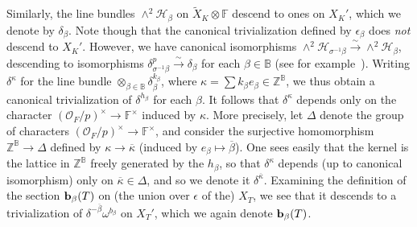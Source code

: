 \documentclass[11pt,pdflatex]{amsart}
\theoremstyle{plain}
\theoremstyle{definition}
\newcommand{\lra}{\longrightarrow}
\newcommand{\FF}{\mathbf{F}}
\newcommand{\ZZ}{\mathbf{Z}}
\newcommand{\CO}{\mathcal{O}}
\theoremstyle{plain}
\theoremstyle{definition}
\theoremstyle{remark}
\numberwithin{equation}{section}
\numberwithin{figure}{section} \numberwithin{table}{subsection}
\def\BB{\mathbb{B}}
\def\FF{\mathbb{F}}
\def\ZZ{\mathbb{Z}}
\begin{document}
Similarly, the line bundles $\wedge^2{\mathcal H}_\beta$ on $\widetilde{X}_K \otimes \FF$ descend to ones on $X_K'$, which we denote by $\delta_\beta$.  Note though that the canonical trivialization defined by $\epsilon_\beta$ does {\em not} descend to $X_K'$. However, we have canonical isomorphisms $\wedge^2{\mathcal H}_{\sigma^{-1}\beta} \stackrel{\sim}{\to} \wedge^2{\mathcal H}_\beta$, descending to isomorphisms $\delta_{\sigma^{-1}\beta}^p \stackrel{\sim}{\lra} \delta_\beta$ for each $\beta \in \BB$ (see for example~\cite[\S3.2.2]{DKS}).  Writing $\delta^\kappa$ for the line bundle $\otimes_{\beta\in\BB}\delta_\beta^{k_\beta}$, where $\kappa = \sum k_\beta e_\beta \in \ZZ^\BB$, we thus obtain a canonical trivialization of $\delta^{h_\beta}$ for each $\beta$.
It follows that $\delta^\kappa$ depends only on the character $(\CO_F/p)^\times \to \FF^\times$ induced by $\kappa$.  More precisely, let $\Delta$ denote the group of characters $(\CO_F/p)^\times \to \FF^\times$, and consider the surjective homomorphism $\ZZ^{\BB} \to \Delta$ defined by $\kappa \to \overline{\kappa}$ (induced by $e_\beta \mapsto \overline{\beta}$).  One sees easily that the kernel is the lattice in $\ZZ^{\BB}$ freely generated by the $h_\beta$, so that $\delta^\kappa$ depends (up to canonical isomorphism) only on $\overline{\kappa} \in \Delta$, and so we denote it $\delta^{\overline{\kappa}}$.  Examining the definition of the section ${\bf b}_\beta(T)$ on (the union over $\epsilon$ of the) $X_T$, we see that it descends to a trivialization of $\delta^{-\overline{\beta}}\omega^{b_\beta}$ on $X_T'$, which we again denote ${\bf b}_\beta(T)$.
\end{document}
